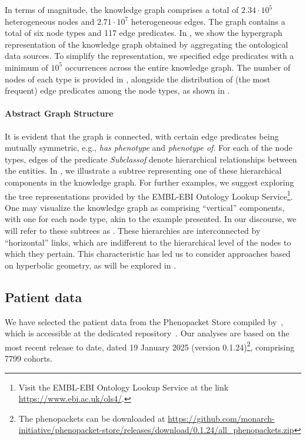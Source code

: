 In terms of magnitude, the knowledge graph comprises a total of $2.34\cdot10^5$ heterogeneous nodes and $2.71\cdot10^7$ heterogeneous edges. The graph contains a total of six node types and 117 edge predicates. In , we show the hypergraph representation of the knowledge graph obtained by aggregating the ontological data sources. To simplify the representation, we specified edge predicates with a minimum of $10^5$ occurrences across the entire knowledge graph. The number of nodes of each type is provided in , alongside the distribution of (the most frequent) edge predicates among the node types, as shown in .

\paragraph{Abstract Graph Structure}\label{sec:abstractGraphStructure}
It is evident that the graph is connected, with certain edge predicates being mutually symmetric, e.g., \emph{has phenotype} and \emph{phenotype of}. For each of the node types, edges of the predicate \emph{Subclassof} denote hierarchical relationships between the entities. In , we illustrate a subtree representing one of these hierarchical components in the knowledge graph. For further examples, we suggest exploring the tree representations provided by the EMBL-EBI Ontology Lookup Service\footnote{Visit the EMBL-EBI Ontology Lookup Service at the link \url{https://www.ebi.ac.uk/ols4/}.}. One may visualize the knowledge graph as comprising ``vertical'' components, with one for each node type, akin to the example presented. In our discourse, we will refer to these subtrees as . These hierarchies are interconnected by ``horizontal'' links, which are indifferent to the hierarchical level of the nodes to which they pertain. This characteristic has led us to consider approaches based on hyperbolic geometry, as will be explored in .

\subsection{Patient data}
We have selected the patient data from the Phenopacket Store compiled by~\cite{Danis2025Phenopackets}, which is accessible at the dedicated repository~\cite{Robinson2024PhenopacketStore}. Our analyses are based on the most recent release to date, dated 19 January 2025 (version 0.1.24)\footnote{The phenopackets can be downloaded at \url{https://github.com/monarch-initiative/phenopacket-store/releases/download/0.1.24/all_phenopackets.zip}}, comprising 7799 cohorts.

